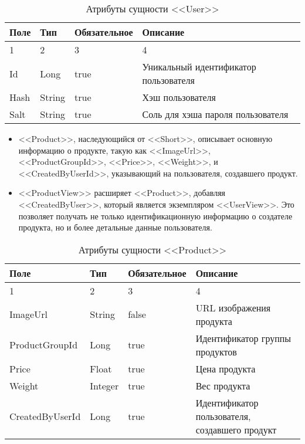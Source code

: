 \vspace{\baselineskip}

\begin{xltabular}{\textwidth}{|l|l|p{1.7cm}|X|}
    \caption{Атрибуты сущности <<User>>}\\ \hline
    Поле & Тип & Обяза\-тельное & Описание \\  & 2 & 3 & 4 \\ \hline
    Id & Long & true & Уникальный идентификатор пользователя \\ \hline
    Hash & String & true & Хэш пользователя \\ \hline
    Salt & String & true & Соль для хэша пароля пользователя \\ \hline
\end{xltabular}

\begin{itemize}
    \item <<Product>>, наследующийся от <<Short>>, описывает основную информацию о продукте, такую как <<ImageUrl>>, <<ProductGroupId>>, <<Price>>, <<Weight>>, и <<CreatedByUserId>>, указывающий на пользователя, создавшего продукт.
    \item <<ProductView>> расширяет <<Product>>, добавляя <<CreatedByUser>>, который является экземпляром <<UserView>>. Это позволяет получать не только идентификационную информацию о создателе продукта, но и более детальные данные пользователя.
\end{itemize}

\begin{xltabular}{\textwidth}{|l|l|p{1.7cm}|X|}
    \caption{Атрибуты сущности <<Product>>}\\ \hline
    Поле & Тип & Обяза\-тельное & Описание \\  & 2 & 3 & 4 \\ \hline
    ImageUrl & String & false & URL изображения продукта \\ \hline
    ProductGroupId & Long & true & Идентификатор группы продуктов \\ \hline
    Price & Float & true & Цена продукта \\ \hline
    Weight & Integer & true & Вес продукта \\ \hline
    CreatedByUserId & Long & true & Идентификатор пользователя, создавшего продукт \\ \hline
\end{xltabular}

